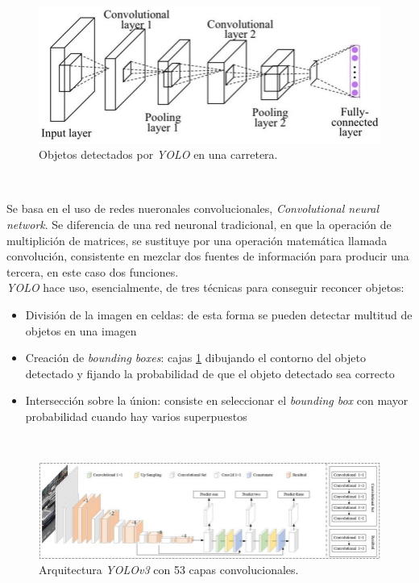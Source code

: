 \begin{figure} [h!]
	\begin{center}
		\includegraphics[width=12cm]{figs/yolo}
	\end{center}
	\caption{Objetos detectados por \textit{YOLO} en una carretera.}
	\label{fig:yolo}
\end{figure}\

Se basa en el uso de redes nueronales convolucionales, \textit{Convolutional neural network}. Se diferencia de una red neuronal tradicional, en que la operación de multiplición de matrices, se sustituye por una operación matemática llamada convolución, consistente en mezclar dos fuentes de información para producir una tercera, en este caso dos funciones.\\

\textit{YOLO} hace uso, esencialmente, de tres técnicas para conseguir reconcer objetos:\\
\begin{itemize}
	\item División de la imagen en celdas: de esta forma se pueden detectar multitud de objetos en una imagen
	\item Creación de \textit{bounding boxes}: cajas \ref{fig:yolo} dibujando el contorno del objeto detectado y fijando la probabilidad de que el objeto detectado sea correcto
	\item Intersección sobre la únion: consiste en seleccionar el \textit{bounding box} con mayor probabilidad cuando hay varios superpuestos
\end{itemize}\

\begin{figure} [h!]
	\begin{center}
		\includegraphics[width=16cm]{figs/yolov353}
	\end{center}
	\caption{Arquitectura \textit{YOLOv3} con 53 capas convolucionales.}
	\label{fig:yololayers}
\end{figure}\

